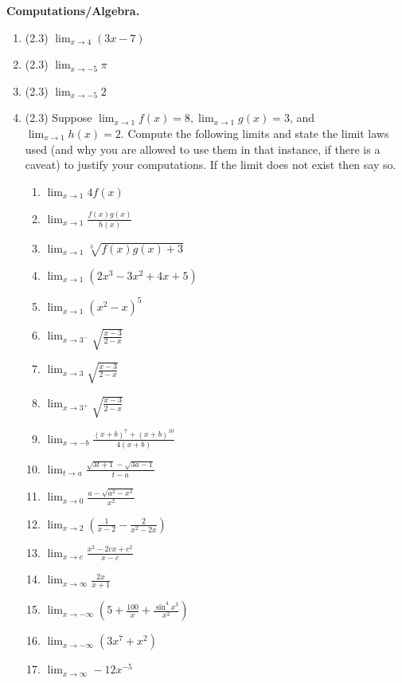 \documentclass[11pt,letterpaper]{article}
\begin{document}
\vspace{1pc}
\item \textbf{Computations/Algebra.} 

\begin{enumerate}
\item (2.3) $\lim_{x\to 4}(3x-7)$
\item (2.3) $\lim_{x\to -5}\pi$
\item (2.3) $\lim_{x\to -5}2$
\item (2.3) Suppose $\lim_{x\to 1}f(x)=8,\lim_{x\to 1}g(x)=3$, and $\lim_{x\to 1}h(x)=2$.  Compute the following limits and state the limit laws used (and why you are allowed to use them in that instance, if there is a caveat) to justify your computations.  If the limit does not exist then say so.
\begin{enumerate}
\item $\lim_{x\to 1}4f(x)$
\item $\lim_{x\to 1}\frac{f(x)g(x)}{h(x)}$
\item $\lim_{x\to 1}\sqrt[3]{f(x)g(x)+3}$
\item $\lim_{x\to 1}(2x^3-3x^2+4x+5)$
\item $\lim_{x\to 1}\left(x^2-x\right)^5$
\item $\lim_{x\to 3^-}\sqrt{\frac{x-3}{2-x}}$
\item $\lim_{x\to 3}\sqrt{\frac{x-3}{2-x}}$
\item $\lim_{x\to 3^+}\sqrt{\frac{x-3}{2-x}}$
\item $\lim_{x\to -b}\frac{(x+b)^7+(x+b)^{10}}{4(x+b)}$
\item $\lim_{t\to a}\frac{\sqrt{3t+1}-\sqrt{3a-1}}{t-a}$
\item $\lim_{x\to 0}\frac{a-\sqrt{a^2-x^2}}{x^2}$
\item $\lim_{x\to 2}\left(\frac{1}{x-2}-\frac{2}{x^2-2x}\right)$
\item $\lim_{x\to c}\frac{x^2-2cx+c^2}{x-c}$
\item $\lim_{x\to\infty}\frac{2x}{x+1}$
\item $\lim_{x\to -\infty}\left(5+\frac{100}{x}+\frac{\sin^4x^3}{x^2}\right)$
\item $\lim_{x\to -\infty}\left(3x^7+x^2\right)$
\item $\lim_{x\to\infty}-12x^{-5}$
\end{enumerate}


\end{enumerate}
\end{document}
